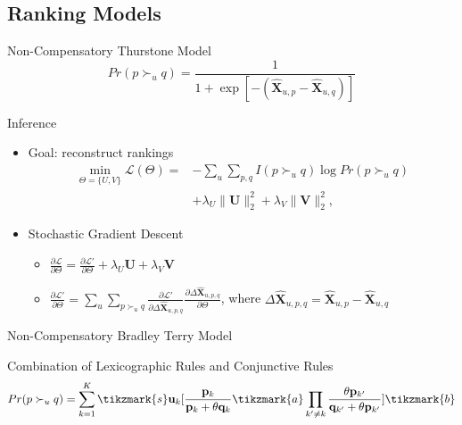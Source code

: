 \documentclass[xcolor=dvipsnames]{beamer}
\newcommand{\Rating}{\mathbf{X}}
\newcommand{\Loss}{\mathcal{L}}
\begin{document}
\subsection{Ranking Models}
\begin{frame}{Non-Compensatory Thurstone Model}
\begin{equation}\label{equ:BPR}
Pr(p\succ_u q) = \frac{1} {1+\exp[-(\hat{\Rating}_{u,p}-\hat{\Rating}_{u,q})]}
\end{equation}
\begin{block}{Inference}
\begin{itemize}
\item Goal: reconstruct rankings
             \begin{eqnarray}\label{equ:BPRloss}
\min_{\Theta=\{U,V\}}\Loss(\Theta) =& -\sum_{u}\sum_{p,q} I(p\succ_u q) \log Pr(p\succ_u q)\\\nonumber
& + \lambda_U\|\mathbf{U}\|^2_2+\lambda_V\|\mathbf{V}\|^2_2,
\end{eqnarray}
    \item Stochastic Gradient Descent
    \begin{itemize}
       
    \item $\frac{\partial \Loss}{\partial \Theta}=\frac{\partial \Loss'}{\partial \Theta}+ \lambda_U \mathbf{U} + \lambda_V \mathbf{V}$
    \item $\frac{\partial \Loss'}{\partial \Theta}=  \sum_u \sum_{p\succ_u q} \frac{\partial \Loss'}{\partial \Delta\hat{\Rating}_{u,p,q} } \frac{\partial \Delta\hat{\Rating}_{u,p,q}  }{\partial \Theta}$, where $\Delta\hat{\Rating}_{u,p,q} =\hat{\Rating}_{u,p}-\hat{\Rating}_{u,q}$
    \end{itemize}
\end{itemize}
    \end{block}
\end{frame}

\begin{frame}{Non-Compensatory Bradley Terry Model}
    \begin{exampleblock}{Combination of Lexicographic Rules and Conjunctive Rules}
\[
Pr(p\succ_u q)  =  \sum_{k=1}^{K} \tikzmark{s}\mathbf{u}_k [ {\frac{\mathbf{p}_k}{\mathbf{p}_k+\theta \mathbf{q}_k}}\tikzmark{a} \prod_{k'\neq k}{ \frac{\theta \mathbf{p}_{k'}}{\mathbf{q}_{k'}+\theta \mathbf{p}_{k'}}}]\tikzmark{b}\]
\end{exampleblock}
\end{frame}
\end{document}
